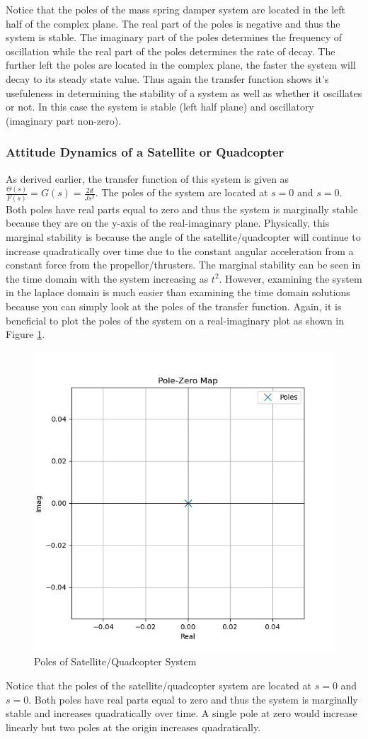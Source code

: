 Notice that the poles of the mass spring damper system are located in the left half of the complex plane. The real part of the poles is negative and thus the system is stable. The imaginary part of the poles determines the frequency of oscillation while the real part of the poles determines the rate of decay. The further left the poles are located in the complex plane, the faster the system will decay to its steady state value. Thus again the transfer function shows it's usefuleness in determining the stability of a system as well as whether it oscillates or not. In this case the system is stable (left half plane) and oscillatory (imaginary part non-zero).

\subsubsection{Attitude Dynamics of a Satellite or Quadcopter}

As derived earlier, the transfer function of this system is given as $\frac{\Theta(s)}{F(s)}= G(s) = \frac{2d}{Js^2}$. The poles of the system are located at $s=0$ and $s=0$. Both poles have real parts equal to zero and thus the system is marginally stable because they are on the y-axis of the real-imaginary plane. Physically, this marginal stability is because the angle of the satellite/quadcopter will continue to increase quadratically over time due to the constant angular acceleration from a constant force from the propellor/thrusters. The marginal stability can be seen in the time domain with the system increasing as $t^2$. However, examining the system in the laplace domain is much easier than examining the time domain solutions because you can simply look at the poles of the transfer function. Again, it is beneficial to plot the poles of the system on a real-imaginary plot as shown in Figure \ref{f:satellite_poles}.
\begin{figure}[H]
\centering
\includegraphics[width=0.4\linewidth]{Figures/satellite_poles.png}
\caption{Poles of Satellite/Quadcopter System}
\label{f:satellite_poles}
\end{figure}
Notice that the poles of the satellite/quadcopter system are located at $s=0$ and $s=0$. Both poles have real parts equal to zero and thus the system is marginally stable and increases quadratically over time. A single pole at zero would increase linearly but two poles at the origin increases quadratically.

